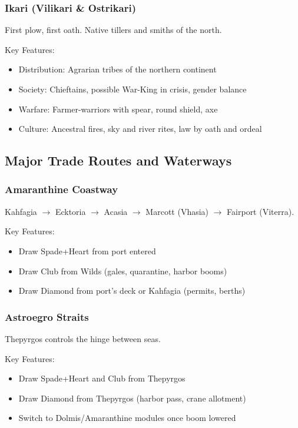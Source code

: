 \subsubsection{Ikari (Vilikari \& Ostrikari)}
\label{sec:ikaripeoples}

First plow, first oath. Native tillers and smiths of the north.

Key Features:
\begin{itemize}
    \item Distribution: Agrarian tribes of the northern continent
    \item Society: Chieftains, possible War-King in crisis, gender balance
    \item Warfare: Farmer-warriors with spear, round shield, axe
    \item Culture: Ancestral fires, sky and river rites, law by oath and ordeal
\end{itemize}

\subsection{Major Trade Routes and Waterways}

\subsubsection{Amaranthine Coastway}
\label{sec:amaranthinecoastway}

Kahfagia $\rightarrow$ Ecktoria $\rightarrow$ Acasia $\rightarrow$ Marcott (Vhasia) $\rightarrow$ Fairport (Viterra).

Key Features:
\begin{itemize}
    \item Draw Spade+Heart from port entered
    \item Draw Club from Wilds (gales, quarantine, harbor booms)
    \item Draw Diamond from port's deck or Kahfagia (permits, berths)
\end{itemize}

\subsubsection{Astroegro Straits}
\label{sec:astroegrostraits}

Thepyrgos controls the hinge between seas.

Key Features:
\begin{itemize}
    \item Draw Spade+Heart and Club from Thepyrgos
    \item Draw Diamond from Thepyrgos (harbor pass, crane allotment)
    \item Switch to Dolmis/Amaranthine modules once boom lowered
\end{itemize}

